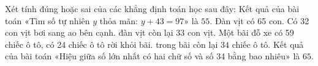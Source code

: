 \begin{ex} %
Xét tính đúng hoặc sai của các khẳng định toán học sau đây:
\choiceTF
{Kết quả của bài toán «Tìm số tự nhiên $y$ thỏa mãn: $y + 43 = 97$» là $55$.}
{\True Đàn vịt có 65 con. Có 32 con vịt bơi sang ao bên cạnh. đàn vịt còn lại $33$ con vịt.}
{Một bãi đỗ xe có 59 chiếc ô tô, có 24 chiếc ô tô rời khỏi bãi. trong bãi còn lại $34$ chiếc ô tô.}
{\True Kết quả của bài toán «Hiệu giữa số lớn nhất có hai chữ số và số 34 bằng bao nhiêu» là $65$.}
\end{ex}


